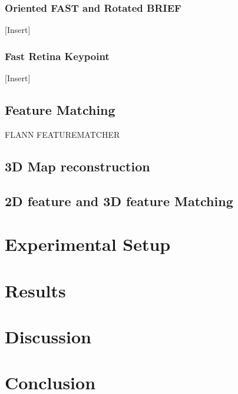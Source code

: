 \documentclass[a4paper]{article}
\begin{document}
\subsubsection{Oriented FAST and Rotated BRIEF}
[Insert]
\subsubsection{Fast Retina Keypoint}
[Insert]
\subsection{Feature Matching}
FLANN FEATUREMATCHER
\subsection{3D Map reconstruction}
\subsection{2D feature and 3D feature Matching}



\section{Experimental Setup}

\section{Results}

\section{Discussion}

\section{Conclusion}



\end{document}
